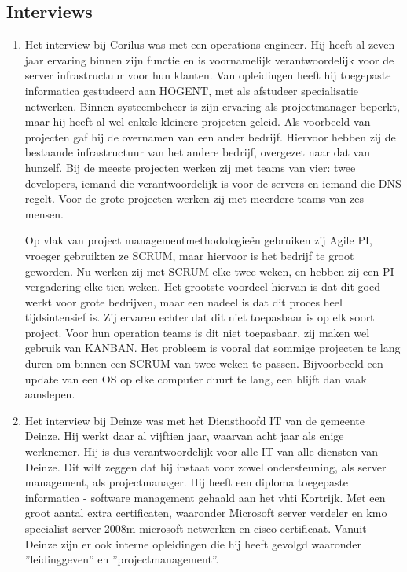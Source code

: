 \documentclass{article}
\begin{document}
    \subsection{Interviews}
    \begin{enumerate}
        \item Het interview bij Corilus was met een operations engineer. Hij heeft al zeven jaar ervaring binnen zijn 
        functie en is voornamelijk verantwoordelijk voor de server infrastructuur voor hun klanten. Van opleidingen
        heeft hij toegepaste informatica gestudeerd aan HOGENT, met als afstudeer specialisatie netwerken. Binnen
        systeembeheer is zijn ervaring als projectmanager beperkt, maar hij heeft al wel enkele kleinere projecten
        geleid. Als voorbeeld van projecten gaf hij de overnamen van een ander bedrijf. Hiervoor hebben
        zij de bestaande infrastructuur van het andere bedrijf, overgezet naar dat van hunzelf. Bij de meeste
        projecten werken zij met teams van vier: twee developers, iemand die verantwoordelijk is voor de servers en
        iemand die DNS regelt. Voor de grote projecten werken zij met meerdere teams van zes mensen.

        Op vlak van project managementmethodologieën gebruiken zij Agile PI, vroeger gebruikten ze SCRUM, maar hiervoor
        is het bedrijf te groot geworden. Nu werken zij met SCRUM elke twee weken, en hebben zij een PI vergadering elke
        tien weken. Het grootste voordeel hiervan is dat dit goed werkt voor grote bedrijven, maar een nadeel is dat
        dit proces heel tijdsintensief is. Zij ervaren echter dat dit niet toepasbaar is op elk soort project. Voor
        hun operation teams is dit niet toepasbaar, zij maken wel gebruik van KANBAN. Het probleem is vooral dat sommige
        projecten te lang duren om binnen een SCRUM van twee weken te passen. Bijvoorbeeld een update van een OS op elke
        computer duurt te lang, een blijft dan vaak aanslepen.

        \item Het interview bij Deinze was met het Diensthoofd IT van de gemeente Deinze. 
        Hij werkt daar al vijftien jaar, waarvan acht jaar als enige werknemer.
        Hij is dus verantwoordelijk voor alle IT van alle diensten van Deinze.
        Dit wilt zeggen dat hij instaat voor zowel ondersteuning, als server management, als projectmanager.
        Hij heeft een diploma toegepaste informatica - software management gehaald aan het vhti Kortrijk.
        Met een groot aantal extra certificaten, waaronder Microsoft server verdeler en kmo specialist server 2008m
        microsoft netwerken en cisco certificaat.
        Vanuit Deinze zijn er ook interne opleidingen die hij heeft gevolgd 
        waaronder ''leidinggeven'' en ''projectmanagement''.
        

\end{enumerate}
\end{document}
